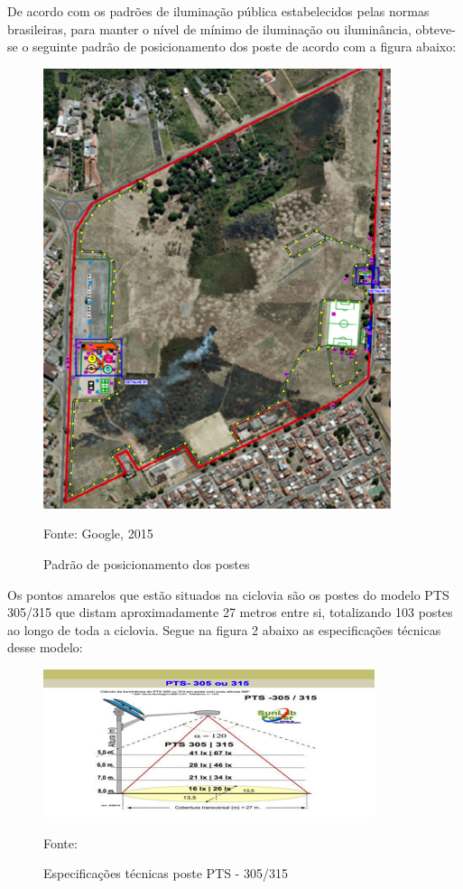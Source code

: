 De acordo com os padr\~oes de ilumina\c{c}\~ao p\'ublica estabelecidos pelas normas brasileiras, para manter o n\'ivel de m\'inimo de ilumina\c{c}\~ao ou ilumin\^ancia, obteve-se o seguinte padr\~ao de posicionamento dos poste de acordo com a figura abaixo:

\begin{figure}[H]
	 \centering
	\label{PosicionamentoPostes}
	 \includegraphics[keepaspectratio=true,scale=0.8]{figuras/PosicionamentoPostes.png}
	 \caption{Padr\~ao de posicionamento dos postes}
	 \small{Fonte: Google, 2015}
\end{figure}

Os pontos amarelos que est\~ao situados na ciclovia s\~ao os postes do modelo PTS 305/315 que distam aproximadamente 27 metros entre si, totalizando 103 postes ao longo de toda a ciclovia. Segue na  figura 2 abaixo as especifica\c{c}\~oes t\'ecnicas desse modelo:

\begin{figure}[H]
	 \centering
	\label{PTS305}
	 \includegraphics[keepaspectratio=true,scale=0.8]{figuras/PTS305.png}
	 \caption{Especifica\c{c}\~oes t\'ecnicas poste PTS - 305/315}
	 \small{Fonte: \cite{SUNLABPTS}}
\end{figure}

